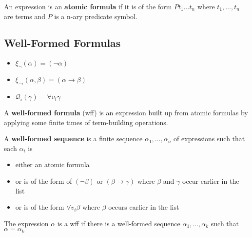 \begin{definition}
    \label{def:AtomicFormula}
    An expression is an \textbf{atomic formula} if it is of the form $P t_1\dots t_n$ where $t_1,\dots,t_n$ are terms and $P$ is a n-ary predicate symbol.
\end{definition}

\subsection{Well-Formed Formulas}

\begin{definition}
    \label{def:FormulaBuildingOperation}
    \begin{itemize}~{}
        \item $\xi_\neg(\alpha) = (\neg \alpha)$
        \item $\xi_\to(\alpha, \beta) = (\alpha\to\beta)$
        \item $\mathcal{Q}_i(\gamma) = \forall v_i\gamma$
    \end{itemize}
\end{definition}

\begin{definition}
    A \textbf{well-formed formula} (wff) is an expression built up from atomic formulas by applying some finite times of term-building operations.
\end{definition}

\begin{definition}
    A \textbf{well-formed sequence} is a finite sequence $\alpha_1,\dots,\alpha_n$ of expressions such that each $\alpha_i$ is
    \begin{itemize}
        \item either an atomic formula
        \item or is of the form of $(\neg \beta)$ or $(\beta\to\gamma)$ where $\beta$ and $\gamma$ occur earlier in the list
        \item or is of the form $\forall v_i\beta$ where $\beta$ occurs earlier in the list
    \end{itemize}
\end{definition}

\begin{proposition}
    The expression $\alpha$ is a wff if there is a well-formed sequence $\alpha_1,\dots,\alpha_k$ such that $\alpha = \alpha_k$
\end{proposition}

